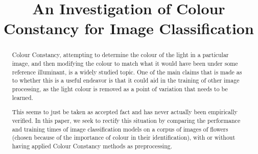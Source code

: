 \documentclass{bmvc2k}
\title{An Investigation of Colour Constancy for Image Classification}
\begin{document}
\maketitle

\begin{abstract}
Colour Constancy, attempting to determine the colour of the light in a particular image, and then 
modifying the colour to match what it would have been under some reference illuminant, is a widely studied topic.
One of the main claims that is made as to whether this is a useful endeavor is that it could aid in the training
of other image processing, as the light colour is removed as a point of variation that needs to be learned.

This seems to just be taken as accepted fact and has never actually been empirically verified. In this paper, we
seek to rectify this situation by comparing the performance and training times of image classification models on 
a corpus of images of flowers (chosen because of the importance of colour in their identification), with or without
having applied Colour Constancy methods as preprocessing.
\end{abstract}






\end{document}

